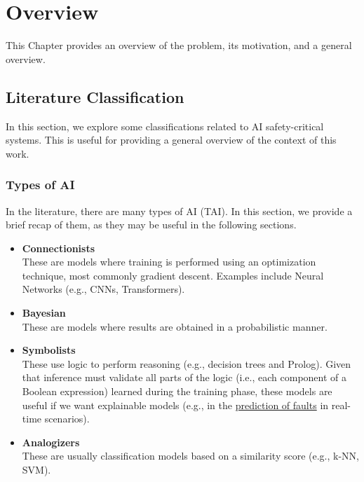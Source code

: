 \chapter{Overview}
This Chapter provides an overview of the problem, its motivation, and a general overview.

\section{Literature Classification}
In this section, we explore some classifications related to AI safety-critical systems. This is useful for providing a general overview of the context of this work.

\subsection{Types of AI}
\label{sec:TAI}
In the literature, there are many types of AI (TAI). In this section, we provide a brief recap of them, as they may be useful in the following sections.
\begin{itemize}
    \item \textbf{Connectionists} \\
    These are models where training is performed using an optimization technique, most commonly gradient descent. Examples include Neural Networks (e.g., CNNs, Transformers).
    \item \textbf{Bayesian} \\
        These are models where results are obtained in a probabilistic manner.
    \item \textbf{Symbolists} \\
        These use logic to perform reasoning (e.g., decision trees and Prolog). Given that inference must validate all parts of the logic (i.e., each component of a Boolean expression) learned during the training phase, these models are useful if we want explainable models (e.g., in the \href{https://github.com/edoardosarri24/violation-prediction-in-realtime-system}{prediction of faults} in real-time scenarios).
    \item \textbf{Analogizers} \\
        These are usually classification models based on a similarity score (e.g., k-NN, SVM).
\end{itemize}

